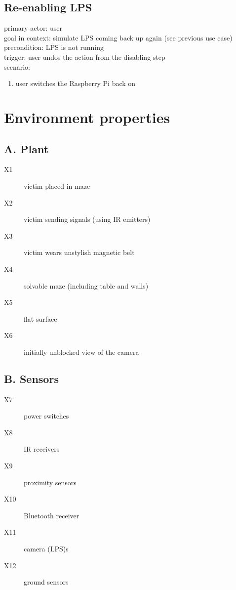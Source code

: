 \documentclass[a4paper,parskip,headheight=38pt]{scrartcl} %
\begin{document}
\subsection{Re-enabling LPS}
primary actor: user \\
goal in context: simulate LPS coming back up again (see previous use case) \\
precondition: LPS is not running \\
trigger: user undos the action from the disabling step \\
scenario: 
\begin{enumerate}[1.]
	\item user switches the Raspberry Pi back on 
\end{enumerate}


\section{Environment properties}

\subsection*{A. Plant}
\begin{description}
\item[X1] victim placed in maze
\item[X2] victim sending signals (using IR emitters)
\item[X3] victim wears unstylish magnetic belt
\item[X4] solvable maze (including table and walls)
\item[X5] flat surface
\item[X6] initially unblocked view of the camera
\end{description}

\subsection*{B. Sensors}
\begin{description}
\item[X7] power switches
\item[X8] IR receivers
\item[X9] proximity sensors
\item[X10] Bluetooth receiver
\item[X11] camera (LPS)s
\item[X12] ground sensors
\end{description}
\end{document}
